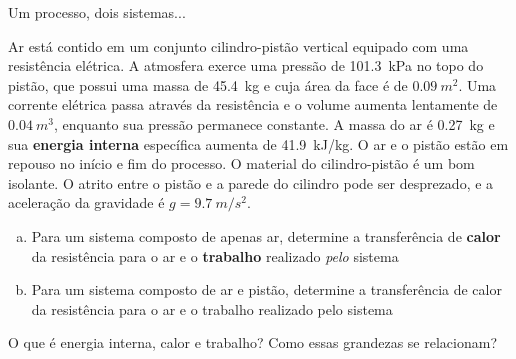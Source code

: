 \documentclass[t,%
brazilian,%
11pt,%
aspectratio=169,%
table%
]{beamer}
\begin{document}
\begin{frame}{Um processo, dois sistemas...}
    \begin{minipage}{\textwidth}
        Ar está contido em um conjunto cilindro-pistão vertical equipado com uma resistência
        elétrica. A atmosfera exerce uma pressão de \SI{101.3}{kPa} no topo do pistão, que possui
        uma massa de \SI{45.4}{kg} e cuja área da face é de \(\SI{0.09}{m^2}\). Uma corrente 
        elétrica passa através da resistência e o volume aumenta lentamente de \(\SI{0.04}{m^3}\),
        enquanto sua pressão permanece constante. A massa do ar é \SI{0.27}{kg} e sua \textbf{energia interna}
        específica aumenta de \SI{41.9}{kJ/kg}. O ar e o pistão estão em repouso no início e fim do processo.
        O material do cilindro-pistão é um bom isolante. O atrito entre o pistão e a parede do cilindro pode ser 
        desprezado, e a aceleração da gravidade é \(g=\SI{9.7}{m/s^2}\).
    \end{minipage}
    \begin{enumerate}[(a)]
        \item Para um sistema composto de apenas ar, determine a transferência de \textbf{calor} da resistência para o ar 
            e o \textbf{trabalho} realizado \textit{pelo} sistema
        \item Para um sistema composto de ar e pistão, determine a transferência de calor da resistência para o ar 
            e o trabalho realizado pelo sistema
    \end{enumerate}

    \pause

    \begin{tcolorbox}[colback=red!20]
        O que é energia interna, calor e trabalho? Como essas grandezas se relacionam?
    \end{tcolorbox}
\end{frame}

\end{document}
